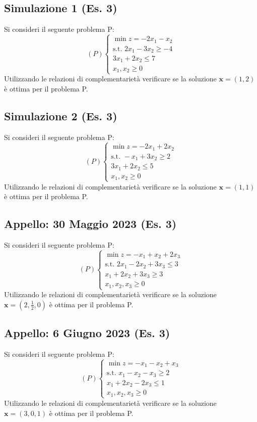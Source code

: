 \documentclass[11pt, a4paper]{article}
\begin{document}
\subsection{Simulazione 1 (Es. 3)}
Si consideri il seguente problema P:
\[ (P) \begin{cases} \min z = -2x_1 - x_2 \\ \text{s.t. } 2x_1 - 3x_2 \ge -4 \\ 3x_1 + 2x_2 \le 7 \\ x_1, x_2 \ge 0 \end{cases} \]
Utilizzando le relazioni di complementarietà verificare se la soluzione $\mathbf{x} = (1,2)$ è ottima per il problema P.

\subsection{Simulazione 2 (Es. 3)}
Si consideri il seguente problema P:
\[ (P) \begin{cases} \min z = -2x_1 + 2x_2 \\ \text{s.t. } -x_1 + 3x_2 \ge 2 \\ 3x_1 + 2x_2 \le 5 \\ x_1, x_2 \ge 0 \end{cases} \]
Utilizzando le relazioni di complementarietà verificare se la soluzione $\mathbf{x} = (1,1)$ è ottima per il problema P.

\subsection{Appello: 30 Maggio 2023 (Es. 3)}
Si consideri il seguente problema P:
\[ (P) \begin{cases} \min z = -x_1 + x_2 + 2x_3 \\ \text{s.t. } 2x_1 - 2x_2 + 3x_3 \le 3 \\ x_1 + 2x_2 + 3x_3 \ge 3 \\ x_1, x_2, x_3 \ge 0 \end{cases} \]
Utilizzando le relazioni di complementarietà verificare se la soluzione $\mathbf{x} = (2, \frac{1}{2}, 0)$ è ottima per il problema P.

\subsection{Appello: 6 Giugno 2023 (Es. 3)}
Si consideri il seguente problema P:
\[ (P) \begin{cases} \min z = -x_1 - x_2 + x_3 \\ \text{s.t. } x_1 - x_2 - x_3 \ge 2 \\ x_1 + 2x_2 - 2x_3 \le 1 \\ x_1, x_2, x_3 \ge 0 \end{cases} \]
Utilizzando le relazioni di complementarietà verificare se la soluzione $\mathbf{x} = (3,0,1)$ è ottima per il problema P.
\end{document}
